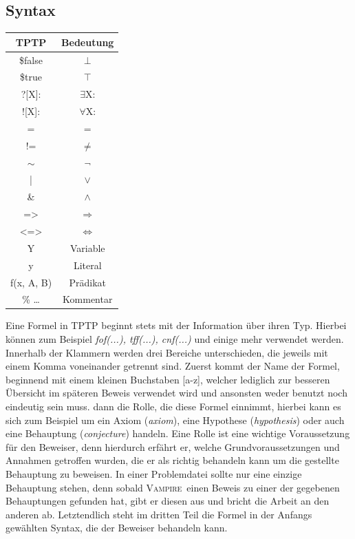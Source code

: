 \documentclass{article}
\newcommand{\vampire}{\textsc{Vampire}~}
\begin{document}
\subsection{Syntax}
\label{subsec:syntax}
\begin{table}
\begin{tabular}{|c|c|}
	\hline TPTP & Bedeutung \\ 
	\hline \$false & $\bot$\\
	\hline \$true & $\top$\\
	\hline ?[X]: & $\exists$X: \\
	\hline ![X]: & $\forall$X: \\
	\hline = & = \\
	\hline != & $\neq$ \\
	\hline $\sim$ & $\lnot$ \\
	\hline | & $\lor$ \\
	\hline \& & $\land$ \\
	\hline => & $\Rightarrow$ \\
	\hline <=> & $\Leftrightarrow$ \\
	\hline Y & Variable \\
	\hline y & Literal \\
	\hline f(x, A, B) & Prädikat \\
	\hline \% \dots & Kommentar \\
	\hline
\end{tabular} 
\end{table}
Eine Formel in TPTP beginnt stets mit der Information über ihren Typ. Hierbei können zum Beispiel \textit{fof(...), tff(...), cnf(...)} und einige mehr verwendet werden.
Innerhalb der Klammern werden drei Bereiche unterschieden, die jeweils mit einem Komma voneinander getrennt sind. 
Zuerst kommt der Name der Formel, beginnend mit einem kleinen Buchstaben [a-z], welcher lediglich zur besseren Übersicht im späteren Beweis verwendet wird und ansonsten weder benutzt noch eindeutig sein muss.
dann die Rolle, die diese Formel einnimmt, hierbei kann es sich zum Beispiel um ein Axiom (\textit{axiom}), eine Hypothese (\textit{hypothesis}) oder auch eine Behauptung (\textit{conjecture}) handeln.
Eine Rolle ist eine wichtige Voraussetzung für den Beweiser, denn hierdurch erfährt er, welche Grundvoraussetzungen und Annahmen getroffen wurden, die er als richtig behandeln kann um die gestellte Behauptung zu beweisen.
In einer Problemdatei sollte nur eine einzige Behauptung stehen, denn sobald \vampire einen Beweis zu einer der gegebenen Behauptungen gefunden hat, gibt er diesen aus und bricht die Arbeit an den anderen ab.
Letztendlich steht im dritten Teil die Formel in der Anfangs gewählten Syntax, die der Beweiser behandeln kann. \cite[S.4-5]{cav2013}
\end{document}
